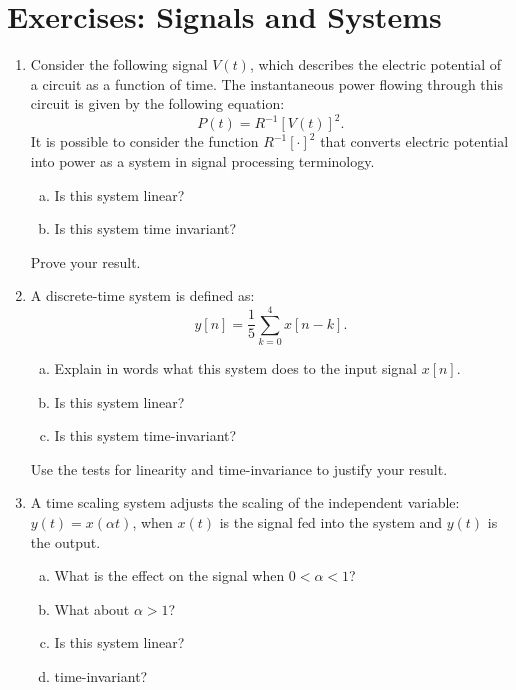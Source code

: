 \newpage
\section{Exercises: Signals and Systems}
\begin{enumerate}

\item Consider the following signal $V(t)$, which describes the electric potential of a circuit as a function of time. The instantaneous power flowing through this circuit is given by the following equation:
\begin{equation*}
    P(t)=R^{-1}[V(t)]^2.
\end{equation*}
It is possible to consider the function $R^{-1}[\cdot]^2$ that converts electric potential into power as a system in signal processing terminology.
\begin{enumerate}[a)]
\item Is this system linear?
\item Is this system time invariant?
\end{enumerate}
Prove your result.

\item A discrete-time system is defined as:
\begin{equation}
  y[n]= \frac{1}{5}\sum_{k=0}^{4} x[n-k].
\end{equation}
  \begin{enumerate}[a)]
  \item Explain in words what this system does to the input signal $x[n]$.
  \item Is this system linear?
  \item Is this system time-invariant?
  \end{enumerate}
Use the tests for linearity and time-invariance to justify your result. 

\item A time scaling system adjusts the scaling of the independent variable: $y(t) = x(\alpha t)$,
when $x(t)$ is the signal fed into the system and $y(t)$ is the output.

\begin{enumerate}[a)]
\item What is the effect on the signal when $0<\alpha<1$?
\item What about $\alpha>1$?
\item Is this system linear?
\item time-invariant?
\end{enumerate}


\end{enumerate}
